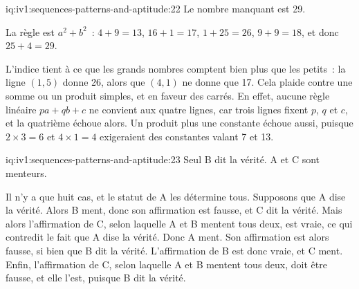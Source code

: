 \begin{solution}{iq:iv1:sequences-patterns-and-aptitude:22}
Le nombre manquant est 29.

La règle est $a^2 + b^2$~: $4 + 9 = 13$, $16 + 1 = 17$, $1 + 25 = 26$, $9 + 9 = 18$, et donc $25 + 4 = 29$.

L'indice tient à ce que les grands nombres comptent bien plus que les petits~: la ligne $(1, 5)$ donne 26, alors que $(4, 1)$ ne donne que 17. Cela plaide contre une somme ou un produit simples, et en faveur des carrés. En effet, aucune règle linéaire $pa + qb + c$ ne convient aux quatre lignes, car trois lignes fixent $p$, $q$ et $c$, et la quatrième échoue alors. Un produit plus une constante échoue aussi, puisque $2 \times 3 = 6$ et $4 \times 1 = 4$ exigeraient des constantes valant 7 et 13.

\end{solution}

\begin{solution}{iq:iv1:sequences-patterns-and-aptitude:23}
Seul B dit la vérité. A et C sont menteurs.

Il n'y a que huit cas, et le statut de A les détermine tous. Supposons que A dise la vérité. Alors B ment, donc son affirmation est fausse, et C dit la vérité. Mais alors l'affirmation de C, selon laquelle A et B mentent tous deux, est vraie, ce qui contredit le fait que A dise la vérité. Donc A ment. Son affirmation est alors fausse, si bien que B dit la vérité. L'affirmation de B est donc vraie, et C ment. Enfin, l'affirmation de C, selon laquelle A et B mentent tous deux, doit être fausse, et elle l'est, puisque B dit la vérité.

\end{solution}

